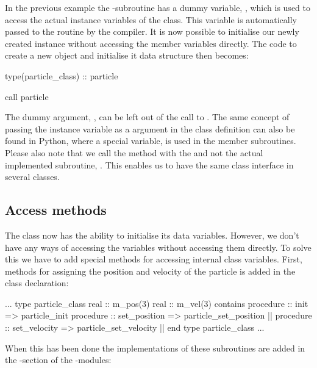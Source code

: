 In the previous example the -subroutine has a dummy variable, , which is used to access the actual instance variables of the class. This variable is automatically passed to the routine by the compiler. It is now possible to initialise our newly created instance without accessing the member variables directly. The code to create a new object and initialise it data structure then becomes:

\begin{fortrancodeenv}
type(particle_class) :: particle

call particle %
\end{fortrancodeenv}

The dummy argument, , can be left out of the call to . The same concept of passing the instance variable as a argument in the class definition can also be found in Python, where a special variable,  is used in the member subroutines. Please also note that we call the method with the  and not the actual implemented subroutine, . This enables us to have the same class interface in several classes.

\subsection{Access methods}

The class now has the ability to initialise its data variables. However, we don't have any ways of accessing the variables without accessing them directly. To solve this we have to add special methods for accessing internal class variables. First, methods for assigning the position and velocity of the particle is added in the class declaration:

\begin{fortrancodeenv}
    ...
    type particle_class
        real :: m_pos(3)
        real :: m_vel(3)
    contains
        procedure :: init => particle_init
        procedure :: set_position => particle_set_position |\hladded|
        procedure :: set_velocity => particle_set_velocity |\hladded|
    end type particle_class
    ...
\end{fortrancodeenv}

When this has been done the implementations of these subroutines are added in the -section of the -modules:

